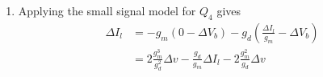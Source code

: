 \documentclass{article}
\begin{document}
\begin{enumerate}
{\begin{enumerate}
{        \begin{align*}
        \Delta I_r &= g_m (\Delta v - \frac{\Delta I_r}{g_m})
                    + g_d (\Delta V_b - \frac{\Delta I_r}{g_m}) \\
                   &= g_m \Delta v - \Delta I_r 
                    + 2 \Delta I_r - \frac{g_d}{g_m} \Delta I_r 
        \end{align*}
        so $\frac{g_d}{g_m} \Delta I_r = g_m \Delta v$, or
        $\Delta I_r = \frac{g_m^2}{g_d} \Delta v$, so
        $\Delta V_b = 2\frac{g_m^2}{g_d^2} \Delta v$.
      }
      \item{
        Applying the small signal model for $Q_4$ gives
        \begin{align*}
          \Delta I_l &= -g_m(0 - \Delta V_b)
                        -g_d(\frac{\Delta I_l}{g_m} - \Delta V_b) \\
                     &= 2\frac{g_m^3}{g_d^2} \Delta v
                      - \frac{g_d}{g_m} \Delta I_l - 2\frac{g_m^2}{g_d} \Delta v
        \end{align*}
      }
    \end{enumerate}
  }
\end{enumerate}
\end{document}
